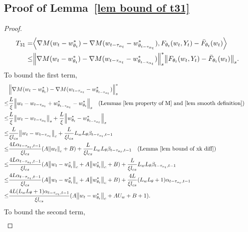 \documentclass[twoside,11pt]{article}
\newcommand{\indot}[2]{{\left<#1, #2\right>}}
\numberwithin{assucounter}{section}
\begin{document}
\subsection{Proof of Lemma~\ref{lem bound of t31}}
\label{sec proof lem bound t31}
\lemboundoftthreeone*
\begin{proof}
  \begin{align}
      T_{31} = &\indot{\nabla M(w_t - w^*_{\theta_t}) - \nabla M(w_{t-\tau_{\alpha_t}} - w^*_{\theta_{t-\tau_{\alpha_t}}})}{F_{\theta_t}(w_t, Y_t) - \bar F_{\theta_t}(w_t)} \\
      \leq &\norm{\nabla M(w_t - w^*_{\theta_t}) - \nabla M(w_{t-\tau_{\alpha_t}} - w^*_{\theta_{t-\tau_{\alpha_t}}})}_s^*\norm{F_{\theta_t}(w_t, Y_t) - \bar F_{\theta_t}(w_t)}_s.
  \end{align}
To bound the first term,
\begin{align}
  &\norm{\nabla M(w_t - w^*_{\theta_t}) - \nabla M(w_{t-\tau_{\alpha_t}} - w^*_{\theta_{t-\tau_{\alpha_t}}})}_s^* \\
  \leq& \frac{L}{\xi} \norm{w_t - w_{t-\tau_{\alpha_t}} + w_{\theta_{t-\tau_{\alpha_t}}}^* - w_{\theta_{t}}^*}_s \qq{(Lemmas \ref{lem property of M} and \ref{lem smooth definition})} \\
  \leq& \frac{L}{\xi} \norm{w_t - w_{t-\tau_{\alpha_t}}}_s + \frac{L}{\xi} \norm{w^*_{\theta_t} - w_{\theta_{t-\tau_{\alpha_t}}}^*}_s \\
  \leq& \frac{L}{\xi l_{cs}} \norm{w_t - w_{t-\tau_{\alpha_t}}}_c + \frac{L}{\xi l_{cs}} L_w L_\theta \beta_{t-\tau_{\alpha_t}, t-1} \\
  \leq& \frac{4L \alpha_{t-\tau_{\alpha_t}, t-1}}{\xi l_{cs}} (A\norm{w_t}_c + B)+ \frac{L}{\xi l_{cs}} L_w L_\theta \beta_{t-\tau_{\alpha_t}, t-1} \qq{(Lemma \ref{lem bound of xk diff})}\\
  \leq& \frac{4L \alpha_{t-\tau_{\alpha_t}, t-1}}{\xi l_{cs}} (A\norm{w_t - w^*_{\theta_t}}_c + A\norm{w^*_{\theta_t}}_c + B)+ \frac{L}{\xi l_{cs}} L_w L_\theta \beta_{t-\tau_{\alpha_t}, t-1} \\
  \leq& \frac{4L \alpha_{t-\tau_{\alpha_t}, t-1}}{\xi l_{cs}} (A\norm{w_t - w^*_{\theta_t}}_c + A\norm{w^*_{\theta_t}}_c + B)+ \frac{4L}{\xi l_{cs}} (L_w L_\theta + 1) \alpha_{t-\tau_{\alpha_t}, t-1} \\
  \leq& \frac{4L (L_wL_\theta+1) \alpha_{t-\tau_{\alpha_t}, t-1}}{\xi l_{cs}} (A\norm{w_t - w^*_{\theta_t}}_c + AU_w + B + 1).
\end{align}
To bound the second term,
\begin{align}

\end{align}
\end{proof}
\end{document}
